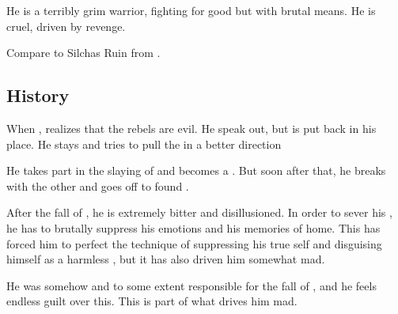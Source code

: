 He is a terribly grim warrior, fighting for good but with brutal means. He is cruel, driven by revenge. 

Compare to Silchas Ruin from \cite{StevenErikson:ReapersGale}.









\subsection{History}
When , \Sithiyacaan{} realizes that the rebels are evil. He speak out, but is put back in his place. He stays and tries to pull the  in a better direction

He takes part in the slaying of \Nexagglachel{} and becomes a \sathariah. But soon after that, he breaks with the other \resphain{} and goes off to found \Kezerad.

After the fall of \Kezerad, he is extremely bitter and disillusioned. In order to sever his , he has to brutally suppress his emotions and his memories of home. This has forced him to perfect the technique of suppressing his true self and disguising himself as a harmless \human, but it has also driven him somewhat mad. 

He was somehow and to some extent responsible for the fall of \Kezerad, and he feels endless guilt over this. This is part of what drives him mad.


